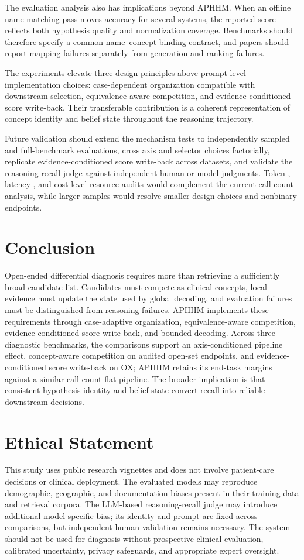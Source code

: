 \documentclass[letterpaper]{article} %
\begin{document}
The evaluation analysis also has implications beyond APHHM.
When an offline name-matching pass moves accuracy for several systems, the reported score reflects both hypothesis quality and normalization coverage.
Benchmarks should therefore specify a common name--concept binding contract, and papers should report mapping failures separately from generation and ranking failures.

The experiments elevate three design principles above prompt-level implementation choices: case-dependent organization compatible with downstream selection, equivalence-aware competition, and evidence-conditioned score write-back.
Their transferable contribution is a coherent representation of concept identity and belief state throughout the reasoning trajectory.

Future validation should extend the mechanism tests to independently sampled and full-benchmark evaluations, cross axis and selector choices factorially, replicate evidence-conditioned score write-back across datasets, and validate the reasoning-recall judge against independent human or model judgments.
Token-, latency-, and cost-level resource audits would complement the current call-count analysis, while larger samples would resolve smaller design choices and nonbinary endpoints.

\section{Conclusion}
\label{sec:conclusion}

Open-ended differential diagnosis requires more than retrieving a sufficiently broad candidate list.
Candidates must compete as clinical concepts, local evidence must update the state used by global decoding, and evaluation failures must be distinguished from reasoning failures.
APHHM implements these requirements through case-adaptive organization, equivalence-aware competition, evidence-conditioned score write-back, and bounded decoding.
Across three diagnostic benchmarks, the comparisons support an axis-conditioned pipeline effect, concept-aware competition on audited open-set endpoints, and evidence-conditioned score write-back on OX; APHHM retains its end-task margins against a similar-call-count flat pipeline.
The broader implication is that consistent hypothesis identity and belief state convert recall into reliable downstream decisions.
%
\section*{Ethical Statement}

This study uses public research vignettes and does not involve patient-care decisions or clinical deployment.
The evaluated models may reproduce demographic, geographic, and documentation biases present in their training data and retrieval corpora.
The LLM-based reasoning-recall judge may introduce additional model-specific bias; its identity and prompt are fixed across comparisons, but independent human validation remains necessary.
The system should not be used for diagnosis without prospective clinical evaluation, calibrated uncertainty, privacy safeguards, and appropriate expert oversight.
 

\end{document}
